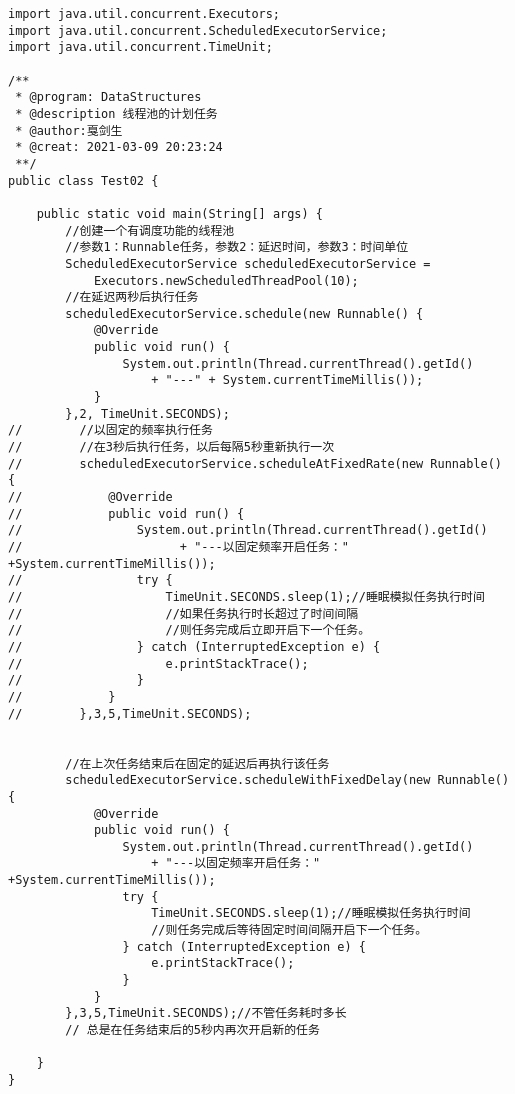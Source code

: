 \documentclass[a4paper]{report}
\begin{document}
\begin{Verbatim}[frame=single,numbersep=5pt,xleftmargin=1.5em,xrightmargin=1.5em]
import java.util.concurrent.Executors;
import java.util.concurrent.ScheduledExecutorService;
import java.util.concurrent.TimeUnit;

/**
 * @program: DataStructures
 * @description 线程池的计划任务
 * @author:戛剑生
 * @creat: 2021-03-09 20:23:24
 **/
public class Test02 {

    public static void main(String[] args) {
        //创建一个有调度功能的线程池
        //参数1：Runnable任务，参数2：延迟时间，参数3：时间单位
        ScheduledExecutorService scheduledExecutorService =
            Executors.newScheduledThreadPool(10);
        //在延迟两秒后执行任务
        scheduledExecutorService.schedule(new Runnable() {
            @Override
            public void run() {
                System.out.println(Thread.currentThread().getId()
                    + "---" + System.currentTimeMillis());
            }
        },2, TimeUnit.SECONDS);
//        //以固定的频率执行任务
//        //在3秒后执行任务，以后每隔5秒重新执行一次
//        scheduledExecutorService.scheduleAtFixedRate(new Runnable() {
//            @Override
//            public void run() {
//                System.out.println(Thread.currentThread().getId()
//                      + "---以固定频率开启任务：" +System.currentTimeMillis());
//                try {
//                    TimeUnit.SECONDS.sleep(1);//睡眠模拟任务执行时间
//                    //如果任务执行时长超过了时间间隔
//                    //则任务完成后立即开启下一个任务。
//                } catch (InterruptedException e) {
//                    e.printStackTrace();
//                }
//            }
//        },3,5,TimeUnit.SECONDS);


        //在上次任务结束后在固定的延迟后再执行该任务
        scheduledExecutorService.scheduleWithFixedDelay(new Runnable() {
            @Override
            public void run() {
                System.out.println(Thread.currentThread().getId()
                    + "---以固定频率开启任务：" +System.currentTimeMillis());
                try {
                    TimeUnit.SECONDS.sleep(1);//睡眠模拟任务执行时间
                    //则任务完成后等待固定时间间隔开启下一个任务。
                } catch (InterruptedException e) {
                    e.printStackTrace();
                }
            }
        },3,5,TimeUnit.SECONDS);//不管任务耗时多长
        // 总是在任务结束后的5秒内再次开启新的任务

    }
}
\end{Verbatim}
\end{document}
